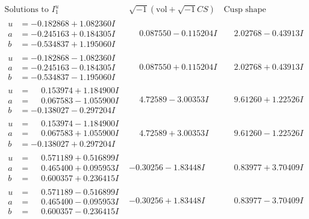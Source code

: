 \documentclass[1p]{elsarticle_modified}
\theoremstyle{definition}
\newcommand{\I}{\sqrt{-1}}
\begin{document}
$$\begin{array}{c|c|c}  
\text{Solutions to }I^u_{1}& \I (\text{vol} + \sqrt{-1}CS) & \text{Cusp shape}\\
 \hline 
\begin{aligned}
u &= -0.182868 + 1.082360 I \\
a &= -0.245163 + 0.184305 I \\
b &= -0.534837 + 1.195060 I\end{aligned}
 & \phantom{-}0.087550 - 0.115204 I & \phantom{-}2.02768 - 0.43913 I \\ \hline\begin{aligned}
u &= -0.182868 - 1.082360 I \\
a &= -0.245163 - 0.184305 I \\
b &= -0.534837 - 1.195060 I\end{aligned}
 & \phantom{-}0.087550 + 0.115204 I & \phantom{-}2.02768 + 0.43913 I \\ \hline\begin{aligned}
u &= \phantom{-}0.153974 + 1.184900 I \\
a &= \phantom{-}0.067583 - 1.055900 I \\
b &= -0.138027 - 0.297204 I\end{aligned}
 & \phantom{-}4.72589 - 3.00353 I & \phantom{-}9.61260 + 1.22526 I \\ \hline\begin{aligned}
u &= \phantom{-}0.153974 - 1.184900 I \\
a &= \phantom{-}0.067583 + 1.055900 I \\
b &= -0.138027 + 0.297204 I\end{aligned}
 & \phantom{-}4.72589 + 3.00353 I & \phantom{-}9.61260 - 1.22526 I \\ \hline\begin{aligned}
u &= \phantom{-}0.571189 + 0.516899 I \\
a &= \phantom{-}0.465400 + 0.095953 I \\
b &= \phantom{-}0.600357 + 0.236415 I\end{aligned}
 & -0.30256 - 1.83448 I & \phantom{-}0.83977 + 3.70409 I \\ \hline\begin{aligned}
u &= \phantom{-}0.571189 - 0.516899 I \\
a &= \phantom{-}0.465400 - 0.095953 I \\
b &= \phantom{-}0.600357 - 0.236415 I\end{aligned}
 & -0.30256 + 1.83448 I & \phantom{-}0.83977 - 3.70409 I \\ \hline\begin{aligned}

\end{aligned}
\end{array}$$
\end{document}
